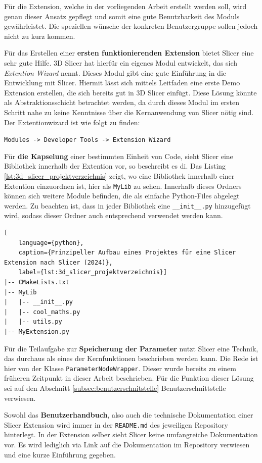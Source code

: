 Für die Extension, welche in der vorliegenden Arbeit erstellt werden soll, wird genau
dieser Ansatz gepflegt und somit eine gute Benutzbarkeit des Moduls gewährleistet.
Die speziellen wünsche der konkreten Benutzergruppe sollen jedoch nicht zu kurz
kommen.

Für das Erstellen einer \textbf{ersten funktionierenden Extension} bietet Slicer eine
sehr gute Hilfe. 3D Slicer hat hierfür ein eigenes Modul entwickelt, das sich
\textit{Extention Wizard} nennt. Dieses Modul gibt eine gute Einführung in die
Entwicklung mit Slicer. Hiermit lässt sich mittels Leitfaden eine erste Demo Extension
erstellen, die sich bereits gut in 3D Slicer einfügt. Diese Lösung könnte als Abstraktionsschicht
betrachtet werden, da durch dieses Modul im ersten Schritt nahe zu keine
Kenntnisse über die Kernanwendung von Slicer nötig sind. Der Extentionwizard ist
wie folgt zu finden:

\texttt{Modules -> Developer Tools -> Extension Wizard}

Für \textbf{die Kapselung} einer bestimmten Einheit von Code, sieht Slicer eine
Bibliothek innerhalb der Extention vor, so beschreibt es di\citet{slicer2024}.
Das Listing \ref{lst:3d_slicer_projektverzeichnis} zeigt, wo eine Bibliothek innerhalb
einer Extention einzuordnen ist, hier als \texttt{MyLib} zu sehen. Innerhalb
dieses Ordners können sich weitere Module befinden, die als einfache Python-Files
abgelegt werden. Zu beachten ist, dass in jeder Bibliothek eine \texttt{\_\_init\_\_.py}
hinzugefügt wird, sodass dieser Ordner auch entsprechend verwendet werden kann.

\begin{lstlisting}[
    language={python},
    caption={Prinzipeller Aufbau eines Projektes für eine Slicer Extension nach Slicer (2024)},
    label={lst:3d_slicer_projektverzeichnis}]
|-- CMakeLists.txt
|-- MyLib
|   |-- __init__.py
|   |-- cool_maths.py
|   |-- utils.py
|-- MyExtension.py
\end{lstlisting}

Für die Teilaufgabe zur \textbf{Speicherung der Parameter} nutzt Slicer eine Technik, das
durchaus als eines der Kernfunktionen beschrieben werden kann. Die Rede ist hier
von der Klasse \texttt{ParameterNodeWrapper}. Dieser wurde bereits zu einem
früheren Zeitpunkt in dieser Arbeit beschrieben. Für die Funktion dieser Lösung sei
auf den Abschnitt \ref{subsec:benutzerschnitstelle} Benutzerschnittstelle verwiesen.

Sowohl das \textbf{Benutzerhandbuch}, also auch die technische Dokumentation einer Slicer
Extension wird immer in der \texttt{README.md} des jeweiligen Repository hinterlegt.
In der Extension selber sieht Slicer keine umfangreiche Dokumentation vor. Es wird
lediglich via Link auf die Dokumentation im Repository verwiesen und eine kurze Einführung
gegeben.

